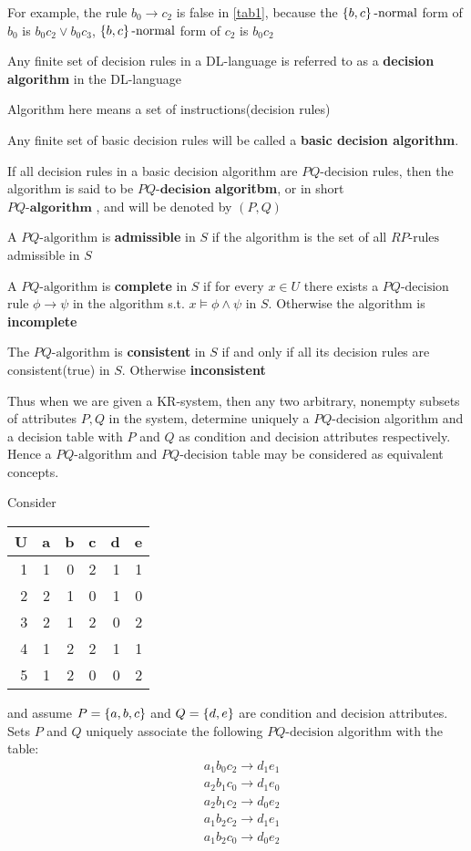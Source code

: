 \documentclass[11pt]{article}
\begin{document}
For example, the rule \(b_0 \to c_2\) is false in \ref{tab1}, because the 
\(\left\{ b,c\right\}\text{-normal}\) form of \(b_0\) is \(b_0 c_2 \vee b_0 c_3\), 
\(\left\{ b,c\right\}\text{-normal}\) form of \(c_2\) is \(b_0 c_2\)

Any finite set of decision rules in a DL-language is referred to as a
\textbf{decision algorithm} in the DL-language

Algorithm here means a set of instructions(decision rules)

Any finite set of basic decision rules will be called a \textbf{basic decision algorithm}.

If all decision rules in a basic decision algorithm are 
\(PQ\text{-decision}\) rules, then the algorithm is said to be 
\(PQ\textbf{-decision}\) \textbf{algoritbm}, or in short\\
\(PQ\textbf{-algorithm}\) , and will be denoted by \((P,Q)\)

A \(PQ\text{-algorithm}\) is \textbf{admissible} in \(S\) if the algorithm is the set of
all \(RP\text{-rules}\) admissible in \(S\)

A \(PQ\text{-algorithm}\) is \textbf{complete} in \(S\) if for every \(x\in U\) there exists
a \(PQ\text{-decision}\) rule \(\phi\to\psi\) in the algorithm s.t. \(x\models\phi\wedge\psi\)
in \(S\). Otherwise the algorithm is \textbf{incomplete}

The \(PQ\text{-algorithm}\) is \textbf{consistent} in \(S\) if and only if all its
decision rules are consistent(true) in \(S\). Otherwise \textbf{inconsistent}


Thus when we are given a KR-system, then any two arbitrary, nonempty subsets
of attributes \(P,Q\) in the system, determine uniquely a 
\(PQ\text{-decision}\) algorithm and a decision table with \(P\) and \(Q\) as
condition and decision attributes respectively. Hence a 
\(PQ\text{-algorithm}\) and
\(PQ\text{-decision}\) table may be considered as 
equivalent concepts.

Consider
\begin{center}
\begin{tabular}{rrrrrr}
U & a & b & c & d & e\\
\hline
1 & 1 & 0 & 2 & 1 & 1\\
2 & 2 & 1 & 0 & 1 & 0\\
3 & 2 & 1 & 2 & 0 & 2\\
4 & 1 & 2 & 2 & 1 & 1\\
5 & 1 & 2 & 0 & 0 & 2\\
\end{tabular}
\end{center}
and assume \(P=\left\{ a,b,c\right\}\) and \(Q=\left\{ d,e\right\}\) are condition and decision
attributes. Sets \(P\) and \(Q\) uniquely associate the following
\(PQ\text{-decision}\) algorithm with the table:
\begin{align*}
  &a_1b_0c_2\to d_1e_1\\
  &a_2b_1c_0\to d_1e_0\\
  &a_2b_1c_2\to d_0e_2\\
  &a_1b_2c_2\to d_1e_1\\
  &a_1b_2c_0\to d_0e_2\\
\end{align*}
\end{document}
